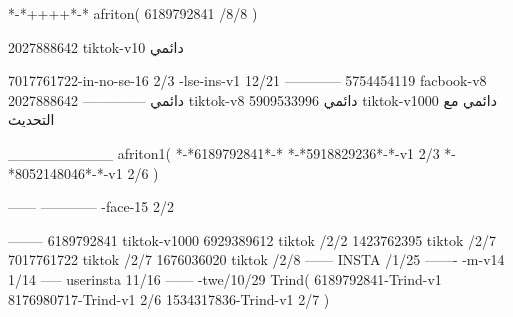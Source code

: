 *-*++++*-*
afriton(
6189792841 /8/8
)

2027888642 tiktok-v10
دائمي

7017761722-in-no-se-16 2/3
-lse-ins-v1 12/21
------------
5754454119 facbook-v8
دائمي
--------------
2027888642 tiktok-v8
دائمي
5909533996 tiktok-v1000
دائمي مع التحديث

__________
afriton1(
*-*6189792841*-*
*-*5918829236*-*-v1 2/3
*-*8052148046*-*-v1 2/6
)

------
------------
-face-15 2/2

--------
6189792841 tiktok-v1000
6929389612 tiktok /2/2
1423762395 tiktok /2/7
7017761722 tiktok /2/7
1676036020 tiktok /2/8
------
 INSTA /1/25
-------
-m-v14 1/14
-----
userinsta 11/16
------
-twe/10/29
Trind(
6189792841-Trind-v1 
8176980717-Trind-v1 2/6
1534317836-Trind-v1 2/7
)

